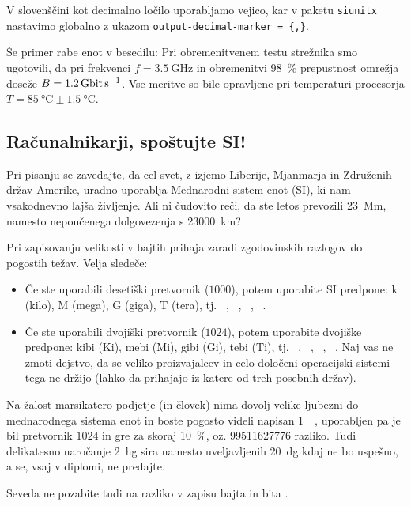 \documentclass[a4paper,12pt,openright]{book}
\begin{document}
V slovenščini kot decimalno ločilo uporabljamo vejico, kar v paketu \texttt{siunitx} nastavimo globalno z ukazom \texttt{output-decimal-marker = \{,\}}.

Še primer rabe enot v besedilu: Pri obremenitvenem testu strežnika smo ugotovili, da pri frekvenci $f = \qty{3,5}{\giga\hertz}$ in obremenitvi \qty{98}{\percent} prepustnost omrežja doseže $B = \qty{1,2}{\giga\bit\per\second}$. Vse meritve so bile opravljene pri temperaturi procesorja $T = \qty{85}{\degreeCelsius} \pm \qty{1,5}{\degreeCelsius}$.

\subsection{Računalnikarji, spoštujte SI!}
Pri pisanju se zavedajte, da cel svet, z izjemo Liberije, Mjanmarja in Združenih držav Amerike, uradno uporablja Mednarodni sistem enot (SI), ki nam vsakodnevno lajša življenje. Ali ni čudovito reči, da ste letos prevozili \qty{23}{\mega\meter}, namesto nepoučenega dolgovezenja s \qty{23000}{\kilo\meter}?

Pri zapisovanju velikosti v bajtih prihaja zaradi zgodovinskih razlogov do pogostih težav. Velja sledeče:
\begin{itemize}
\item Če ste uporabili desetiški pretvornik ($1000$), potem uporabite SI predpone: k (kilo), M (mega), G (giga), T (tera), tj. \unit{\kilo\byte}, \unit{\mega\byte}, \unit{\giga\byte}, \unit{\tera\byte}.
\item Če ste uporabili dvojiški pretvornik ($1024$), potem uporabite dvojiške predpone: 
kibi (\unit{Ki}), mebi (\unit{Mi}), gibi (\unit{Gi}), tebi (\unit{Ti}), 
tj. \unit{\kibi\byte}, \unit{\mebi\byte}, \unit{\gibi\byte}, \unit{\tebi\byte}. 
Naj vas ne zmoti dejstvo, da se veliko proizvajalcev in celo določeni operacijski 
sistemi tega ne držijo (lahko da prihajajo iz katere od treh posebnih držav).
\end{itemize}

Na žalost marsikatero podjetje (in človek) nima dovolj velike ljubezni do mednarodnega sistema enot in boste pogosto videli napisan \qty{1}{\tera\byte}, uporabljen pa je bil pretvornik $1024$ in gre za skoraj \qty{10}{\percent}, oz. \qty{99511627776}{\byte} razliko. Tudi delikatesno naročanje \qty{2}{\hecto\gram} sira namesto uveljavljenih \qty{20}{\deca\gram} kdaj ne bo uspešno, a se, vsaj v diplomi, ne predajte.

Seveda ne pozabite tudi na razliko v zapisu bajta \unit{\byte} in bita \unit{\bit}.
\end{document}
